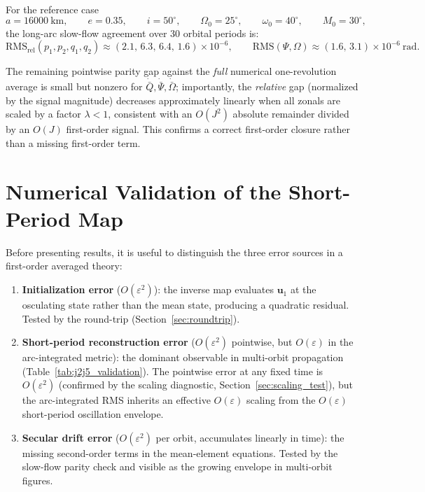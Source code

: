 \documentclass[11pt]{article}
\begin{document}
For the reference case
\[
a=16000\ \mathrm{km},\qquad
e=0.35,\qquad
i=50^\circ,\qquad
\Omega_0=25^\circ,\qquad
\omega_0=40^\circ,\qquad
M_0=30^\circ,
\]
the long-arc slow-flow agreement over $30$ orbital periods is:
\begin{equation}
\mathrm{RMS}_{\mathrm{rel}}(p_1,p_2,q_1,q_2)
\approx
(2.1,\,6.3,\,6.4,\,1.6)\times 10^{-6},
\qquad
\mathrm{RMS}(\Psi,\Omega)
\approx
(1.6,\,3.1)\times 10^{-6}\ \mathrm{rad}.
\end{equation}

The remaining pointwise parity gap against the \emph{full} numerical
one-revolution average is small but nonzero for
$\dot{\bar Q},\dot{\bar\Psi},\dot{\bar\Omega}$; importantly, the
\emph{relative} gap (normalized by the signal magnitude) decreases
approximately linearly when all zonals are scaled by a factor
$\lambda < 1$, consistent with an $O(J^2)$ absolute remainder divided by
an $O(J)$ first-order signal. This confirms a correct first-order closure
rather than a missing first-order term.

\section{Numerical Validation of the Short-Period Map}
\label{sec:validation}

Before presenting results, it is useful to distinguish the three error sources
in a first-order averaged theory:
\begin{enumerate}
\item \textbf{Initialization error} ($O(\varepsilon^2)$): the inverse map
  evaluates $\bm u_1$ at the osculating state rather than the mean state,
  producing a quadratic residual. Tested by the round-trip
  (Section~\ref{sec:roundtrip}).
\item \textbf{Short-period reconstruction error} ($O(\varepsilon^2)$
  pointwise, but $O(\varepsilon)$ in the arc-integrated metric):
  the dominant observable in multi-orbit propagation
  (Table~\ref{tab:j2j5_validation}). The pointwise error at any fixed time is
  $O(\varepsilon^2)$ (confirmed by the scaling diagnostic,
  Section~\ref{sec:scaling_test}), but the arc-integrated RMS inherits an
  effective $O(\varepsilon)$ scaling from the $O(\varepsilon)$ short-period
  oscillation envelope.
\item \textbf{Secular drift error} ($O(\varepsilon^2)$ per orbit, accumulates
  linearly in time): the missing second-order terms in the mean-element
  equations. Tested by the slow-flow parity check and visible as the
  growing envelope in multi-orbit figures.
\end{enumerate}
\end{document}
